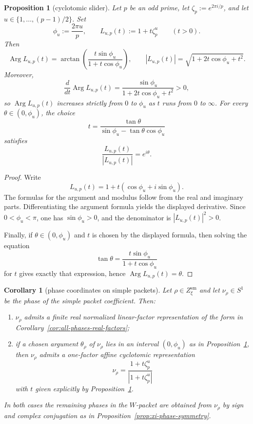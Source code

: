 \documentclass[11pt,a4paper]{article}
\newtheorem{proposition}[theorem]{Proposition}
\newtheorem{corollary}[theorem]{Corollary}
\theoremstyle{definition}
\theoremstyle{remark}
\DeclareMathOperator{\Arg}{Arg}
\begin{document}
\begin{proposition}[cyclotomic slider]\label{prop:cyclotomic-slider}
Let $p$ be an odd prime, let $\zeta_p:=e^{2\pi i/p}$, and let $u\in\{1,\dots,(p-1)/2\}$. Set
\[
\phi_u:=\frac{2\pi u}{p},
\qquad
L_{u,p}(t):=1+t\zeta_p^u
\qquad (t>0).
\]
Then
\[
\Arg L_{u,p}(t)=\arctan\!\left(\frac{t\sin\phi_u}{1+t\cos\phi_u}\right),
\qquad
|L_{u,p}(t)|=\sqrt{1+2t\cos\phi_u+t^2}.
\]
Moreover,
\[
\frac{d}{dt}\Arg L_{u,p}(t)=\frac{\sin\phi_u}{1+2t\cos\phi_u+t^2}>0,
\]
so $\Arg L_{u,p}(t)$ increases strictly from $0$ to $\phi_u$ as $t$ runs from $0$ to $\infty$. For every $\theta\in(0,\phi_u)$, the choice
\[
t=\frac{\tan\theta}{\sin\phi_u-\tan\theta\cos\phi_u}
\]
satisfies
\[
\frac{L_{u,p}(t)}{|L_{u,p}(t)|}=e^{i\theta}.
\]
\end{proposition}

\begin{proof}
Write
\[
L_{u,p}(t)=1+t(\cos\phi_u+i\sin\phi_u).
\]
The formulas for the argument and modulus follow from the real and imaginary parts. Differentiating the argument formula yields the displayed derivative. Since $0<\phi_u<\pi$, one has $\sin\phi_u>0$, and the denominator is $|L_{u,p}(t)|^2>0$.

Finally, if $\theta\in(0,\phi_u)$ and $t$ is chosen by the displayed formula, then solving the equation
\[
\tan\theta=\frac{t\sin\phi_u}{1+t\cos\phi_u}
\]
for $t$ gives exactly that expression, hence $\Arg L_{u,p}(t)=\theta$.
\end{proof}

\begin{corollary}[phase coordinates on simple packets]\label{cor:phase-coordinates}
Let $\rho\in Z_\xi^{\mathrm{sm}}$ and let $\nu_\rho\in S^1$ be the phase of the simple packet coefficient. Then:
\begin{enumerate}[label=(\roman*)]
\item $\nu_\rho$ admits a finite real normalized linear-factor representation of the form in Corollary~\ref{cor:all-phases-real-factors};
\item if a chosen argument $\theta_\rho$ of $\nu_\rho$ lies in an interval $(0,\phi_u)$ as in Proposition~\ref{prop:cyclotomic-slider}, then $\nu_\rho$ admits a one-factor affine cyclotomic representation
\[
\nu_\rho=\frac{1+t\zeta_p^u}{|1+t\zeta_p^u|}
\]
with $t$ given explicitly by Proposition~\ref{prop:cyclotomic-slider}.
\end{enumerate}
In both cases the remaining phases in the $W$-packet are obtained from $\nu_\rho$ by sign and complex conjugation as in Proposition~\ref{prop:xi-phase-symmetry}.
\end{corollary}
\end{document}
